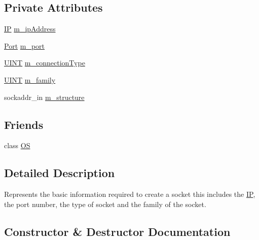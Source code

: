 \subsection*{Private Attributes}
\begin{DoxyCompactItemize}
\item 
\hyperlink{class_communication_1_1_i_p}{I\+P} \hyperlink{class_communication_1_1_socket_structure_a25cbb53ed15f74e6bebb4e6dace2f731}{m\+\_\+ip\+Address}
\item 
\hyperlink{class_communication_1_1_port}{Port} \hyperlink{class_communication_1_1_socket_structure_a9c1d1e42bb9fb4aca9e77233bc872455}{m\+\_\+port}
\item 
\hyperlink{typedefs_8h_a2e2c38961834f28c06e17e074eb00bc7}{U\+I\+N\+T} \hyperlink{class_communication_1_1_socket_structure_a36dd474f4205869987fa88c2c1e6e08e}{m\+\_\+connection\+Type}
\item 
\hyperlink{typedefs_8h_a2e2c38961834f28c06e17e074eb00bc7}{U\+I\+N\+T} \hyperlink{class_communication_1_1_socket_structure_ac87c8414d43ba2b1a1ba0b30983aa1b4}{m\+\_\+family}
\item 
sockaddr\+\_\+in \hyperlink{class_communication_1_1_socket_structure_a34c100e39a27e68a5cc3235b0c552e27}{m\+\_\+structure}
\end{DoxyCompactItemize}
\subsection*{Friends}
\begin{DoxyCompactItemize}
\item 
class \hyperlink{class_communication_1_1_socket_structure_a9564a1cc322bc3c0b2bf8625ea5dfeb2}{O\+S}
\end{DoxyCompactItemize}


\subsection{Detailed Description}
Represents the basic information required to create a socket this includes the \hyperlink{class_communication_1_1_i_p}{I\+P}, the port number, the type of socket and the family of the socket. 

\subsection{Constructor \& Destructor Documentation}
\hypertarget{class_communication_1_1_socket_structure_ab741b5359897e17320ae2d1f494f21f4}{}
